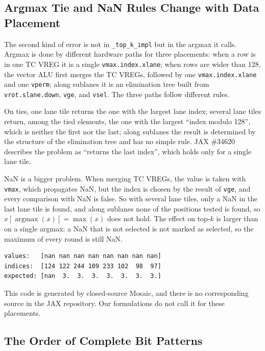 \documentclass[sigconf,nonacm,balance=false]{acmart}
\newcommand{\code}[1]{\texttt{#1}}
\begin{document}
\subsection{Argmax Tie and NaN Rules Change with Data Placement}
\label{sec:4.2}

The second kind of error is not in \code{\_\allowbreak{}top\_\allowbreak{}k\_\allowbreak{}impl} but in the argmax it calls. Argmax is done by different hardware paths for three placements: when a row is in one TC VREG it is a single \code{vmax.\allowbreak{}index.\allowbreak{}xlane}; when rows are wider than 128, the vector ALU first merges the TC VREGs, followed by one \code{vmax.\allowbreak{}index.\allowbreak{}xlane} and one \code{vperm}; along sublanes it is an elimination tree built from \code{vrot.\allowbreak{}slane.\allowbreak{}down}, \code{vge}, and \code{vsel}. The three paths follow different rules.

On ties, one lane tile returns the one with the largest lane index; several lane tiles return, among the tied elements, the one with the largest ``index modulo 128'', which is neither the first nor the last; along sublanes the result is determined by the structure of the elimination tree and has no simple rule. JAX \#34620~\cite{jax-issue-34620} describes the problem as ``returns the last index'', which holds only for a single lane tile.

NaN is a bigger problem. When merging TC VREGs, the value is taken with \code{vmax}, which propagates NaN, but the index is chosen by the result of \code{vge}, and every comparison with NaN is false. So with several lane tiles, only a NaN in the last lane tile is found, and along sublanes none of the positions tested is found, so $x[\operatorname{argmax}(x)] = \max(x)$ does not hold. The effect on top-$k$ is larger than on a single argmax: a NaN that is not selected is not marked as selected, so the maximum of every round is still NaN.

\begin{lstlisting}
values:   [nan nan nan nan nan nan nan nan]
indices:  [124 122 244 109 233 102  98  97]
expected: [nan  3.  3.  3.  3.  3.  3.  3.]
\end{lstlisting}
This code is generated by closed-source Mosaic, and there is no corresponding source in the JAX repository. Our formulations do not call it for these placements.

\subsection{The Order of Complete Bit Patterns}
\label{sec:4.3}
\end{document}
